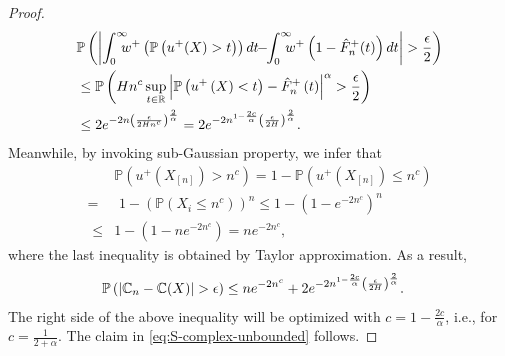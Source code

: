 \begin{proof}
\begin{align}
&\mathbb{P}\left(\left|\intinfinity\!\!\!\! w^+\left(\Prob{u^+(X)>t}\right) dt \!\!-\!\! \intinfinity\!\!\!\! w^+\left(1- {\hat F^+_n}(t)\right) dt\right|>\frac{\epsilon}{2}\right)
\nonumber\\
& \leq \mathbb{P}\left(Hn^c\sup_{t\in \mathbb{R}} \left|\Prob{u^+\left(X\right)<t}-{\hat F^+_n}\left(t\right)\right|^\alpha > \frac{\epsilon}{2}\right)
\nonumber\\
&
\leq  2 e^{-2n \left(\frac{\epsilon}{2Hn^c} \right)^\frac{2}{\alpha}} = 
2 e^{-2n^{1-\frac{2c}{\alpha}}\left(\frac{\epsilon}{2H}\right)^{\frac{2}{\alpha}}} .\label{eq:dkw3}
\end{align}
Meanwhile, by invoking sub-Gaussian property, we infer that
\begin{align*}
\,\,&\mathbb{P}\left(u^+ \left(X_{[n]}\right) >  n^c \right) = 1- \mathbb{P}\left(u^+ \left(X_{[n]} \right) \leq n^c \right)\\
=&\,\, 1- \left(\mathbb{P}\left(X_i \leq n^c \right)\right)^n \leq 1 - \left(1 - e^{-2n^c}\right)^n \\
\,\,\leq &1- \left(1- ne^{-2n^c} \right) = ne^{-2n^c},
\end{align*}
where the last inequality is obtained by Taylor approximation.
As a result, 
\begin{align*}
& \mathbb{P}\left(\left|\mathbb{C}_n -\mathbb{C}(X) \right| > \epsilon \right) 
\leq n e ^{-2n^c} + 2 e^{-2n^{1-\frac{2c}{\alpha}}\left(\frac{\epsilon}{2H}\right)^{\frac{2}{\alpha}}}.
\end{align*}
The right side of the above inequality will be optimized with $c = 1 - \frac{2c}{\alpha}$, i.e., for $c = \frac{1}{2+\alpha}$. The claim in \eqref{eq:S-complex-unbounded} follows.


\end{proof}
